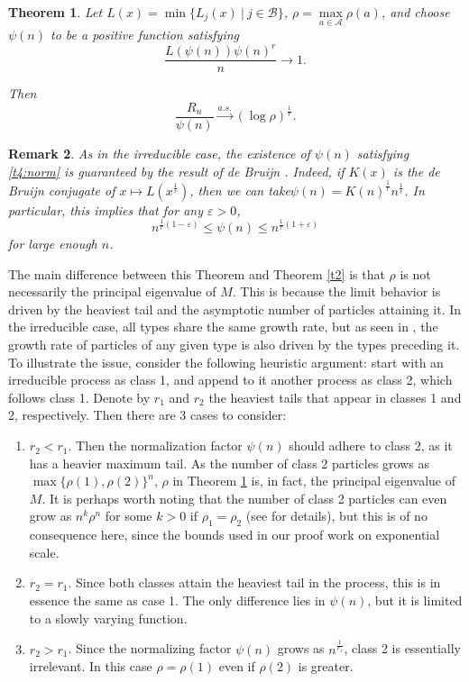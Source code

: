 \documentclass[12pt]{article}
\numberwithin{equation}{section}
\newtheorem{theorem}{Theorem}[section]
\newtheorem{remark}[theorem]{Remark}
\begin{document}
\begin{theorem}\label{t4}
         Let $L(x) = \min\{L_j(x) \ | \ j \in \mathcal{B} \}$, $\rho = \max\limits_{a \in \mathcal{A}} \rho(a)$, and choose $\psi(n)$ to be a positive function satisfying
\begin{equation}\label{t4:norm}
\frac {L(\psi(n))\psi(n)^{r}} n \rightarrow 1.
\end{equation}

Then
\[
\frac {R_n} {\psi(n)} \xrightarrow{a.s.}  (\log \rho)^{\frac 1 {r}}.
\]

    \end{theorem}
    \begin{remark}\label{t4:remark}
    \emph{As in the irreducible case, the existence of $\psi(n)$ satisfying \eqref{t4:norm} is guaranteed by the result of de Bruijn \cite{DeBruijn}. Indeed, if $K(x)$ is the de Bruijn conjugate of $x \mapsto L\left(x^{\frac 1 r}\right)$, then we can take$\psi(n)=K(n)^{\frac 1 r}n^{\frac 1 r}$. In particular, this implies that for any $\varepsilon > 0$, \[
    n^{\frac 1 r (1-\varepsilon)} \leq \psi(n) \leq n^{\frac 1 r (1+\varepsilon)}
    \]
    for large enough $n$.
    }
\end{remark}
The main difference between this Theorem and Theorem \ref{t2} is that $\rho$ is not necessarily the principal eigenvalue of $M$. This is because the limit behavior is driven by the heaviest tail and the asymptotic number of particles attaining it. In the irreducible case, all types share the same growth rate, but as seen in \cite{kesten2}, the growth rate of particles of any given type is also driven by the types preceding it. To illustrate the issue, consider the following heuristic argument: start with an irreducible process as class 1, and append to it another process as class 2, which follows class 1. Denote by $r_1$ and $r_2$ the heaviest tails that appear in classes 1 and 2, respectively. Then there are 3 cases to consider: 
\begin{enumerate}
    \item $r_2 < r_1$. Then the normalization factor $\psi(n)$ should adhere to class 2, as it has a heavier maximum tail. As the number of class 2 particles grows as $\max\{\rho(1),\rho(2)\}^n$, $\rho$ in Theorem \ref{t4} is, in fact, the principal eigenvalue of $M$. It is perhaps worth noting that the number of class 2 particles can even grow as $n^k\rho^n$ for some $k>0$ if $\rho_1=\rho_2$ (see \cite{kesten2} for details), but this is of no consequence here, since the bounds used in our proof work on exponential scale.
    \item $r_2 = r_1$. Since both classes attain the heaviest tail in the process, this is in essence the same as case 1. The only difference lies in $\psi(n)$, but it is limited to a slowly varying function.
    \item $r_2 > r_1$. Since the normalizing factor $\psi(n)$ grows as $n^{\frac 1 {r_1}}$, class 2 is essentially irrelevant. In this case $\rho=\rho(1)$ even if $\rho(2)$ is greater.

\end{enumerate}
\end{document}
